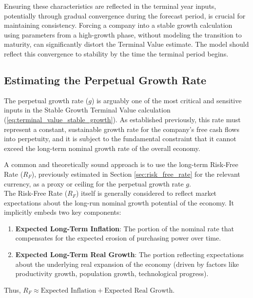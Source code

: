 Ensuring these characteristics are reflected in the terminal year inputs, potentially through gradual convergence during the forecast period, is crucial for maintaining consistency. Forcing a company into a stable growth calculation using parameters from a high-growth phase, without modeling the transition to maturity, can significantly distort the Terminal Value estimate. The model should reflect this convergence to stability by the time the terminal period begins.

\subsection{Estimating the Perpetual Growth Rate} \label{sec:estimating_g}
The perpetual growth rate (\(g\)) is arguably one of the most critical and sensitive inputs in the Stable Growth Terminal Value calculation (\ref{eq:terminal_value_stable_growth}). As established previously, this rate must represent a constant, sustainable growth rate for the company's free cash flows into perpetuity, and it is subject to the fundamental constraint that it cannot exceed the long-term nominal growth rate of the overall economy.

A common and theoretically sound approach is to use the long-term Risk-Free Rate (\(R_F\)), previously estimated in Section \ref{sec:risk_free_rate} for the relevant currency, as a proxy or ceiling for the perpetual growth rate \(g\).\\
The Risk-Free Rate (\(R_F\)) itself is generally considered to reflect market expectations about the long-run nominal growth potential of the economy. It implicitly embeds two key components:
\begin{enumerate}
    \item \textbf{Expected Long-Term Inflation}: The portion of the nominal rate that compensates for the expected erosion of purchasing power over time.
    \item \textbf{Expected Long-Term Real Growth}: The portion reflecting expectations about the underlying real expansion of the economy (driven by factors like productivity growth, population growth, technological progress).
\end{enumerate}
Thus, \(R_F \approx \text{Expected Inflation} + \text{Expected Real Growth}\).


